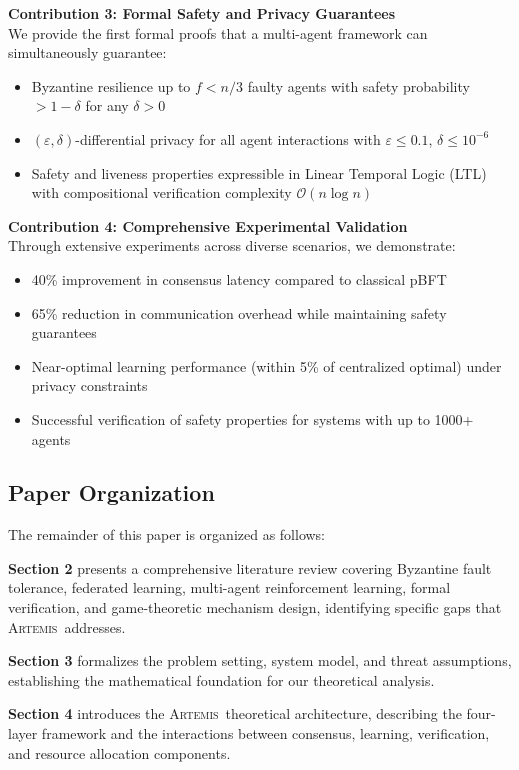 \documentclass[conference]{IEEEtran}
\newcommand{\artemis}{\textsc{Artemis}}
\newcommand{\bigO}{\mathcal{O}}
\newcommand{\epsilon}{\varepsilon}
\begin{document}
\textbf{Contribution 3: Formal Safety and Privacy Guarantees}\\
We provide the first formal proofs that a multi-agent framework can simultaneously guarantee:
\begin{itemize}
    \item Byzantine resilience up to $f < n/3$ faulty agents with safety probability $> 1-\delta$ for any $\delta > 0$
    \item $(\epsilon,\delta)$-differential privacy for all agent interactions with $\epsilon \leq 0.1$, $\delta \leq 10^{-6}$
    \item Safety and liveness properties expressible in Linear Temporal Logic (LTL) with compositional verification complexity $\bigO(n \log n)$
\end{itemize}

\textbf{Contribution 4: Comprehensive Experimental Validation}\\
Through extensive experiments across diverse scenarios, we demonstrate:
\begin{itemize}
    \item 40\% improvement in consensus latency compared to classical pBFT
    \item 65\% reduction in communication overhead while maintaining safety guarantees
    \item Near-optimal learning performance (within 5\% of centralized optimal) under privacy constraints
    \item Successful verification of safety properties for systems with up to 1000+ agents
\end{itemize}

\subsection{Paper Organization}

The remainder of this paper is organized as follows:

\textbf{Section 2} presents a comprehensive literature review covering Byzantine fault tolerance, federated learning, multi-agent reinforcement learning, formal verification, and game-theoretic mechanism design, identifying specific gaps that \artemis\ addresses.

\textbf{Section 3} formalizes the problem setting, system model, and threat assumptions, establishing the mathematical foundation for our theoretical analysis.

\textbf{Section 4} introduces the \artemis\ theoretical architecture, describing the four-layer framework and the interactions between consensus, learning, verification, and resource allocation components.
\end{document}
